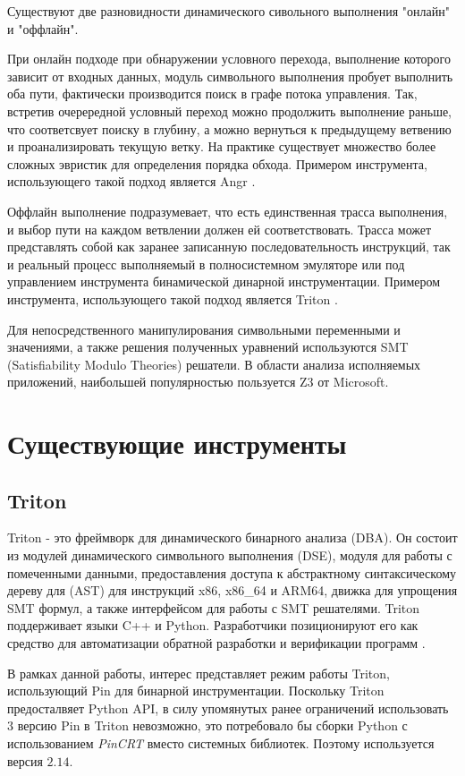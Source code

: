 Существуют две разновидности динамического сивольного выполнения "онлайн" и "оффлайн".

При онлайн подходе при обнаружении условного перехода, выполнение которого зависит от входных данных, модуль символьного выполнения пробует выполнить оба пути, фактически производится поиск в графе потока управления. Так, встретив очерередной условный переход можно продолжить выполнение раньше, что соответсвует поиску в глубину, а можно вернуться к предыдущему ветвению и проанализировать текущую ветку. На практике существует множество более сложных эвристик для определения порядка обхода.
Примером инструмента, использующего такой подход является Angr \cite{Angr}.

Оффлайн выполнение подразумевает, что есть единственная трасса выполнения, и выбор пути на каждом ветвлении должен ей соответствовать. Трасса может представлять собой как заранее записанную последовательность инструкций, так и реальный процесс выполняемый в полносистемном эмуляторе или под управлением инструмента бинамической динарной инструментации.
Примером инструмента, использующего такой подход является Triton \cite{Triton}.

Для непосредственного манипулирования символьными переменными и значениями, а также решения полученных уравнений используются SMT (Satisfiability Modulo Theories) решатели. В области анализа исполняемых приложений, наибольшей популярностью пользуется Z3 \cite{Z3} от Microsoft.



\section{Существующие инструменты}


\subsection{Triton}

Triton - это фреймворк для динамического бинарного анализа (DBA). Он состоит из модулей динамического символьного выполнения (DSE), модуля для работы с помеченными данными, предоставления доступа к абстрактному синтаксическому дереву для (AST) для инструкций x86, x86\_64 и ARM64, движка для упрощения SMT формул, а также интерфейсом для работы с SMT решателями. Triton поддерживает языки C++ и Python.
Разработчики позиционируют его как средство для автоматизации обратной разработки и верификации программ \cite{Triton}.

В рамках данной работы, интерес представляет режим работы Triton, использующий Pin для бинарной инструментации. Поскольку Triton предосталвяет Python API, в силу упомянутых ранее ограничений  использовать $3$ версию Pin в Triton невозможно, это потребовало бы сборки Python с использованием \emph{PinCRT} вместо системных библиотек. Поэтому используется версия $2.14$.

